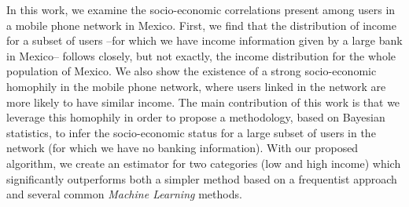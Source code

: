 In this work, we examine the socio-economic correlations present among users in a mobile phone network in Mexico. First, we find that the distribution of income for a subset of users --for which we have income information given by a large bank in Mexico-- follows closely, but not exactly, the income distribution for the whole population of Mexico. We also show the existence of a strong socio-economic homophily in the mobile phone network, where users linked in the network are more likely to have similar income. The main contribution of this work is that we leverage this homophily in order to propose a methodology, based on Bayesian statistics, to infer the socio-economic status for a large subset of users in the network (for which we have no banking information). With our proposed algorithm, we create an estimator for two categories (low and high income) which significantly outperforms both a simpler method based on a frequentist approach and several common \emph{Machine Learning} methods.
